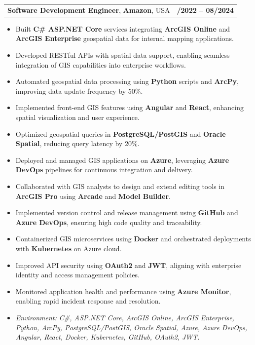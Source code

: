 \documentclass[letterpaper,11pt]{article}
\makeatletter
\newcommand{\resumeItem}[1]{
  \item\footnotesize{
    {#1 \vspace{-2pt}}
  }
}
\newcommand{\resumeSubheading}[4]{
  \vspace{-2pt}\item
    \begin{tabular*}{1.0\textwidth}[t]{l@{\extracolsep{\fill}}r}
      \textbf{\fontsize{10pt}{14pt}\selectfont #3}, \textbf{\fontsize{10pt}{14pt}\selectfont #1}, \fontsize{10pt}{14pt}\selectfont #4 & \textbf{\fontsize{10pt}{14pt}\selectfont #2} \\
    \end{tabular*}\vspace{-7pt}
}
\newcommand{\resumeItemListStart}{\begin{itemize}[leftmargin=*]}
\newcommand{\resumeItemListEnd}{\end{itemize}\vspace{-5pt}}
\makeatother
\begin{document}
\resumeSubheading
{Amazon}{10/2022 -- 08/2024}
{Software Development Engineer}{USA}
\resumeItemListStart
  \resumeItem{Built \textbf{C\# ASP.NET Core} services integrating \textbf{ArcGIS Online} and \textbf{ArcGIS Enterprise} geospatial data for internal mapping applications.}
  \resumeItem{Developed RESTful APIs with spatial data support, enabling seamless integration of GIS capabilities into enterprise workflows.}
  \resumeItem{Automated geospatial data processing using \textbf{Python} scripts and \textbf{ArcPy}, improving data update frequency by 50\%.}
  \resumeItem{Implemented front-end GIS features using \textbf{Angular} and \textbf{React}, enhancing spatial visualization and user experience.}
  \resumeItem{Optimized geospatial queries in \textbf{PostgreSQL/PostGIS} and \textbf{Oracle Spatial}, reducing query latency by 20\%.}
  \resumeItem{Deployed and managed GIS applications on \textbf{Azure}, leveraging \textbf{Azure DevOps} pipelines for continuous integration and delivery.}
  \resumeItem{Collaborated with GIS analysts to design and extend editing tools in \textbf{ArcGIS Pro} using \textbf{Arcade} and \textbf{Model Builder}.}
  \resumeItem{Implemented version control and release management using \textbf{GitHub} and \textbf{Azure DevOps}, ensuring high code quality and traceability.}
  \resumeItem{Containerized GIS microservices using \textbf{Docker} and orchestrated deployments with \textbf{Kubernetes} on Azure cloud.}
  \resumeItem{Improved API security using \textbf{OAuth2} and \textbf{JWT}, aligning with enterprise identity and access management policies.}
  \resumeItem{Monitored application health and performance using \textbf{Azure Monitor}, enabling rapid incident response and resolution.}
  \resumeItem{\textit{Environment: C\#, ASP.NET Core, ArcGIS Online, ArcGIS Enterprise, Python, ArcPy, PostgreSQL/PostGIS, Oracle Spatial, Azure, Azure DevOps, Angular, React, Docker, Kubernetes, GitHub, OAuth2, JWT.}}
\resumeItemListEnd
\end{document}
